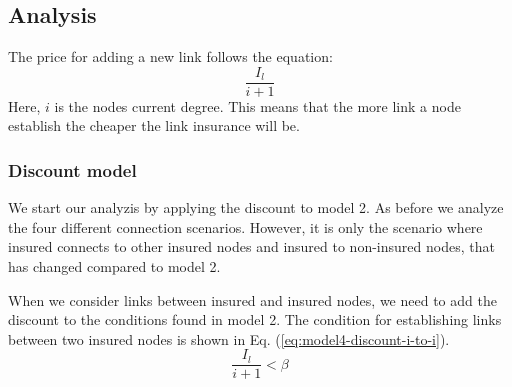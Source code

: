 \subsection{Analysis}
The price for adding a new link follows the equation:
\begin{equation}
\frac{I_{l}}{i+1}
\label{eq:discount0}
\end{equation}
Here, $i$ is the nodes current degree. This means that the more link a node establish the cheaper the link insurance will be. 
\subsubsection{Discount model}
We start our analyzis by applying the discount to model 2. As before we analyze the four different connection scenarios. However, it is only the scenario where insured connects to other insured nodes and insured to non-insured nodes, that has changed compared to model 2.

When we consider links between insured and insured nodes, we need to add the discount to the conditions found in model 2. The condition for establishing links between two insured nodes is shown in Eq. (\ref{eq:model4-discount-i-to-i}).
\begin{equation}
\frac{I_{l}}{i+1}<\beta
\label{eq:model4-discount-i-to-i}
\end{equation}

